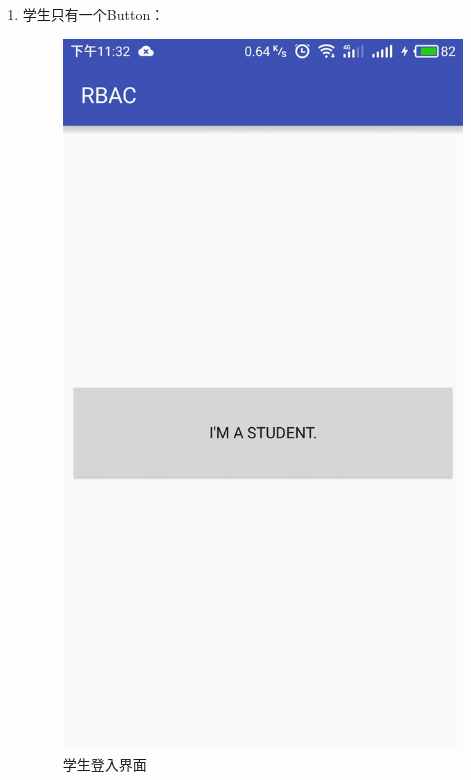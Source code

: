 \begin{itemize}
\begin{enumerate}
\begin{itemize}
\begin{enumerate}
				\item 学生只有一个Button：
				\begin{figure}[H]
					\centering
					\includegraphics[height=0.39\textheight]{snapshot/9}
					\caption{学生登入界面}
					\label{fig:9}
				\end{figure}
			

\end{enumerate}
\end{itemize}
\end{enumerate}
\end{itemize}
